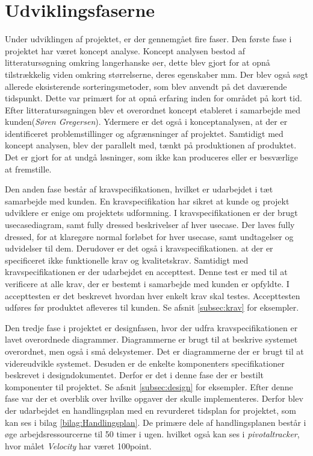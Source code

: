 \section{Udviklingsfaserne}
Under udviklingen af projektet, er der gennemgået fire faser. Den første fase i projektet har været koncept analyse. Koncept analysen bestod af litteratursøgning omkring langerhanske øer, dette blev gjort for at opnå tilstrækkelig viden omkring størrelserne, deres egenskaber mm. Der blev også søgt allerede eksisterende sorteringsmetoder, som blev anvendt på det daværende tidspunkt. Dette var primært for at opnå erfaring inden for området på kort tid. Efter litteratursøgningen blev et overordnet koncept etableret i samarbejde med kunden(\textit{Søren Gregersen}). Ydermere er det også i konceptanalysen, at der er identificeret problemstillinger og afgrænsninger af projektet. Samtidigt med koncept analysen, blev der parallelt med, tænkt på produktionen af produktet. Det er gjort for at undgå løsninger, som ikke kan produceres eller er besværlige at fremstille. 

Den anden fase består af kravspecifikationen, hvilket er udarbejdet i tæt samarbejde med kunden. En kravspecifikation har sikret at kunde og projekt udviklere er enige om projektets udformning. I kravspecifikationen er der brugt usecasediagram, samt fully dressed beskrivelser af hver usecase. Der laves fully dressed, for at klaregøre normal forløbet for hver usecase, samt undtagelser og udvidelser til dem. Derudover er det også i kravspecifikationen. at der er specificeret ikke funktionelle krav og kvalitetskrav. Samtidigt med kravspecifikationen er der udarbejdet en accepttest. Denne test er med til at verificere at alle krav, der er bestemt i samarbejde med kunden er opfyldte. I accepttesten er det beskrevet hvordan hver enkelt krav skal testes. Accepttesten udføres før produktet afleveres til kunden. Se afsnit \ref{subsec:krav} for eksempler.

Den tredje fase i projektet er designfasen, hvor der udfra kravspecifikationen er lavet overordnede diagrammer. Diagrammerne er brugt til at beskrive systemet overordnet, men også i små delsystemer. Det er diagrammerne der er brugt til at videreudvikle systemet. Desuden er de enkelte komponenters specifikationer beskrevet i designdokumentet. Derfor er det i denne fase der er bestilt komponenter til projektet. Se afsnit \ref{subsec:design} for eksempler. Efter denne fase var der et overblik over hvilke opgaver der skulle implementeres. Derfor blev der udarbejdet en handlingsplan med en revurderet tidsplan for projektet, som kan ses i bilag \ref{bilag:Handlingsplan}. De primære dele af handlingsplanen består i øge arbejdsressourcerne til 50 timer i ugen. hvilket også kan ses i \textit{pivotaltracker}, hvor målet \textit{Velocity} har været 100point. 

